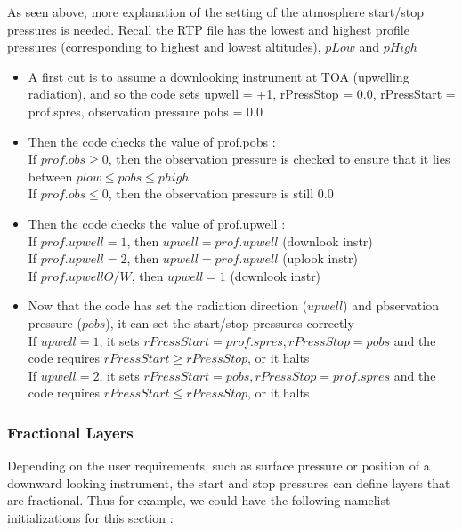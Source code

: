 \documentclass[12pt]{article}
\begin{document}
{As seen above, more explanation of the setting of the atmosphere start/stop 
pressures is needed. Recall the RTP file has the lowest and highest profile
pressures (corresponding to highest and lowest altitudes), $pLow$ and $pHigh$
\begin{itemize}
\item A first cut is to assume a downlooking instrument at TOA (upwelling 
      radiation), and so the code sets upwell = +1, rPressStop = 0.0, 
      rPressStart = prof.spres, observation pressure pobs = 0.0
\item Then the code checks the value of prof.pobs : \\
        If $prof.obs \ge 0$, then the observation pressure is checked to 
        ensure that it lies between $plow \le pobs \le phigh$\\
        If $prof.obs \le 0$, then the observation pressure is still 0.0
\item Then the code checks the value of prof.upwell : \\
        If $prof.upwell = 1$, then $upwell = prof.upwell$ (downlook instr)\\
        If $prof.upwell = 2$, then $upwell = prof.upwell$ (uplook instr)\\
        If $prof.upwell O/W$, then $upwell = 1$ (downlook instr)
\item Now that the code has set the radiation direction ($upwell$) and 
      pbservation pressure ($pobs$), it can set the start/stop pressures 
      correctly \\
        If $upwell = 1$, it sets $rPressStart = prof.spres, rPressStop = pobs$
        and the code requires $rPressStart \ge rPressStop$, or it halts \\
        If $upwell = 2$, it sets $rPressStart = pobs, rPressStop = prof.spres$
        and the code requires $rPressStart \le rPressStop$, or it halts \\
\end{itemize}

\subsubsection{Fractional Layers}
\label{FractionalLayers}

Depending on the user requirements, such as surface pressure or
position of a downward looking instrument, the start and stop
pressures can define layers that are fractional.  Thus for example, we could
have the following namelist initializations for this section : \\

}
\end{document}
